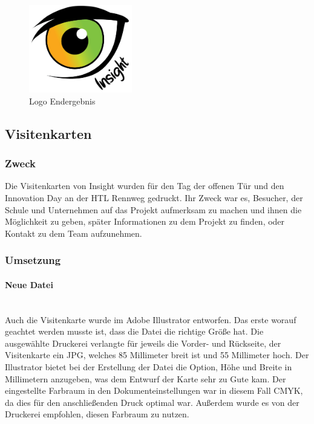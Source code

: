 \begin{figure}[H] 
  \centering
     \includegraphics[width=0.4\textwidth]{design_abb5.png}
  \caption{Logo Endergebnis}
\end{figure}

\subsection{Visitenkarten}
\subsubsection{Zweck}
Die Visitenkarten von Insight wurden für den Tag der offenen Tür und den Innovation Day an der HTL Rennweg gedruckt. Ihr Zweck war es, Besucher, der Schule und Unternehmen auf das Projekt aufmerksam zu machen und ihnen die Möglichkeit zu geben, später Informationen zu dem Projekt zu finden, oder Kontakt zu dem Team aufzunehmen.
\subsubsection{Umsetzung}

\paragraph{Neue Datei}
\leavevmode \\
Auch die Visitenkarte wurde im Adobe Illustrator entworfen. Das erste worauf geachtet werden musste ist, dass die Datei die richtige Größe hat. Die ausgewählte Druckerei verlangte für jeweils die Vorder- und Rückseite, der Visitenkarte ein JPG, welches 85 Millimeter breit ist und 55 Millimeter hoch. Der Illustrator bietet bei der Erstellung der Datei die Option, Höhe und Breite in Millimetern anzugeben, was dem Entwurf der Karte sehr zu Gute kam. Der eingestellte Farbraum in den Dokumenteinstellungen war in diesem Fall CMYK, da dies für den anschließenden Druck optimal war. Außerdem wurde es von der Druckerei empfohlen, diesen Farbraum zu nutzen.\cite{newdoc}

